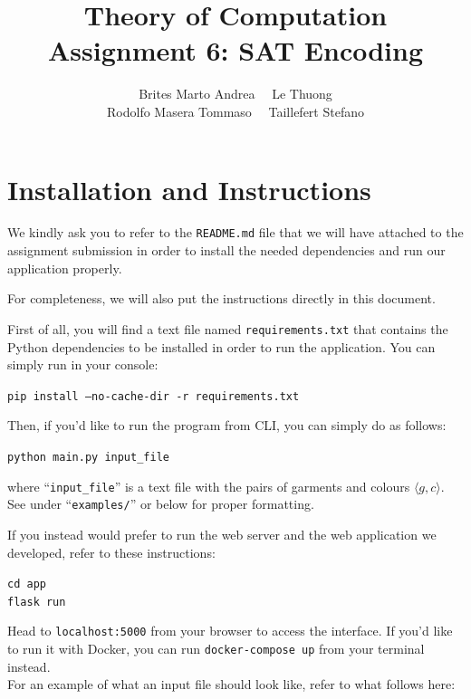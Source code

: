 \documentclass[12pt]{article}
\title{Theory of Computation \\ Assignment 6: SAT Encoding}
\author{Brites Marto Andrea \ \ Le Thuong \\ Rodolfo Masera Tommaso \ \ Taillefert Stefano}
\date{}
\begin{document}
\maketitle

\section{Installation and Instructions}

We kindly ask you to refer to the \texttt{README.md} file that we will have attached to the assignment submission in order to install the needed dependencies and run our application properly.

For completeness, we will also put the instructions directly in this document.

First of all, you will find a text file named \texttt{requirements.txt} that contains the Python dependencies to be installed in order to run the application. You can simply run in your console:

\begin{center}
	\texttt{pip install --no-cache-dir -r requirements.txt}\\
\end{center}

Then, if you'd like to run the program from CLI, you can simply do as follows:

\begin{center}
	\texttt{python main.py input\_file}\\
\end{center}

where ``\texttt{input\_file}'' is a text file with the pairs of garments and colours $\langle g, c \rangle$. See under ``\texttt{examples/}'' or below for proper formatting.

If you instead would prefer to run the web server and the web application we developed, refer to these instructions:

\begin{center}
	\texttt{cd app}\\
	\texttt{flask run}\\
\end{center}

Head to \texttt{localhost:5000} from your browser to access the interface.
If you'd like to run it with Docker, you can run \texttt{docker-compose up} from your terminal instead.\\

For an example of what an input file should look like, refer to what follows here:
\end{document}
